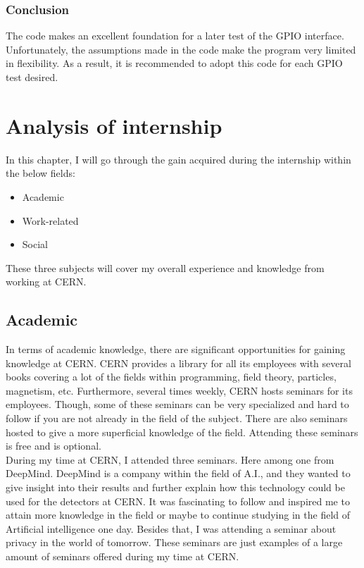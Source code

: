 \subsection{Conclusion}

The code makes an excellent foundation for a later test of the GPIO interface. Unfortunately, the assumptions made in the code make the program very limited in flexibility. As a result, it is recommended to adopt this code for each GPIO test desired.


\chapter{Analysis of internship}

In this chapter, I will go through the gain acquired during the internship within the below fields:

\begin{itemize}
    \item Academic
    \item Work-related
    \item Social
\end{itemize}

\noindent These three subjects will cover my overall experience and knowledge from working at CERN.

\section{Academic}

In terms of academic knowledge, there are significant opportunities for gaining knowledge at CERN. CERN provides a library for all its employees with several books covering a lot of the fields within programming, field theory, particles, magnetism, etc. Furthermore, several times weekly, CERN hosts seminars for its employees. Though, some of these seminars can be very specialized and hard to follow if you are not already in the field of the subject. There are also seminars hosted to give a more superficial knowledge of the field. Attending these seminars is free and is optional. \\

\noindent During my time at CERN, I attended three seminars. Here among one from DeepMind. DeepMind is a company within the field of A.I., and they wanted to give insight into their results and further explain how this technology could be used for the detectors at CERN. It was fascinating to follow and inspired me to attain more knowledge in the field or maybe to continue studying in the field of Artificial intelligence one day. 
Besides that, I was attending a seminar about privacy in the world of tomorrow. These seminars are just examples of a large amount of seminars offered during my time at CERN. \\

